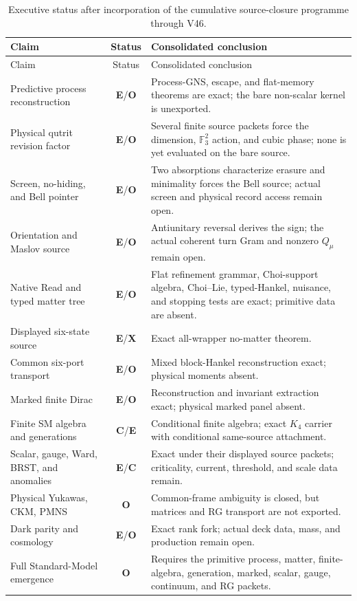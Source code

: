 \documentclass[11pt,oneside,openany]{book}
\numberwithin{equation}{chapter}
\theoremstyle{definition}
\theoremstyle{remark}
\newcommand{\Fthree}{\mathbb F_3}
\newcommand{\statusE}{\textcolor{ExactColor}{\textbf{E}}}
\newcommand{\statusC}{\textcolor{CondColor}{\textbf{C}}}
\newcommand{\statusO}{\textcolor{OpenColor}{\textbf{O}}}
\newcommand{\statusX}{\textcolor{SuperColor}{\textbf{X}}}
\begin{document}
\begin{longtable}{@{}p{}cp{}@{}}
\caption{Executive status after incorporation of the cumulative source-closure
programme through V46.}\label{led:executive-v6}\\
\toprule
Claim & Status & Consolidated conclusion\\
\midrule
\endfirsthead
\toprule
Claim & Status & Consolidated conclusion\\
\midrule
\endhead
Predictive process reconstruction
& \statusE/\statusO
& Process-GNS, escape, and flat-memory theorems are exact; the bare non-scalar
kernel is unexported.\\
\addlinespace
Physical qutrit revision factor
& \statusE/\statusO
& Several finite source packets force the dimension, \(\Fthree^2\) action, and cubic
phase; none is yet evaluated on the bare source.\\
\addlinespace
Screen, no-hiding, and Bell pointer
& \statusE/\statusO
& Two absorptions characterize erasure and minimality forces the Bell source;
actual screen and physical record access remain open.\\
\addlinespace
Orientation and Maslov source
& \statusE/\statusO
& Antiunitary reversal derives the sign; the actual coherent turn Gram and
nonzero \(Q_\mu\) remain open.\\
\addlinespace
Native Read and typed matter tree
& \statusE/\statusO
& Flat refinement grammar, Choi-support algebra, Choi--Lie, typed-Hankel,
nuisance, and stopping tests are exact; primitive data are absent.\\
\addlinespace
Displayed six-state source
& \statusE/\statusX
& Exact all-wrapper no-matter theorem.\\
\addlinespace
Common six-port transport
& \statusE/\statusO
& Mixed block-Hankel reconstruction exact; physical moments absent.\\
\addlinespace
Marked finite Dirac
& \statusE/\statusO
& Reconstruction and invariant extraction exact; physical marked panel absent.\\
\addlinespace
Finite SM algebra and generations
& \statusC/\statusE
& Conditional finite algebra; exact \(K_4\) carrier with conditional same-source
attachment.\\
\addlinespace
Scalar, gauge, Ward, BRST, and anomalies
& \statusE/\statusC
& Exact under their displayed source packets; criticality, current, threshold,
and scale data remain.\\
\addlinespace
Physical Yukawas, CKM, PMNS
& \statusO
& Common-frame ambiguity is closed, but matrices and RG transport are not
exported.\\
\addlinespace
Dark parity and cosmology
& \statusE/\statusO
& Exact rank fork; actual deck data, mass, and production remain open.\\
\addlinespace
Full Standard-Model emergence
& \statusO
& Requires the primitive process, matter, finite-algebra, generation, marked,
scalar, gauge, continuum, and RG packets.\\
\bottomrule
\end{longtable}
\tableofcontents
\listoftables
\end{document}
